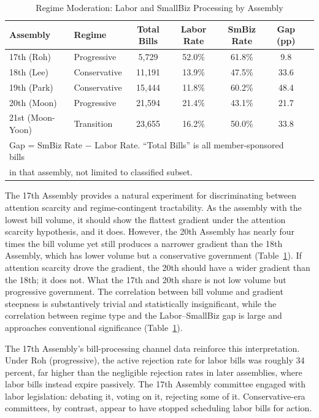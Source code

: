 \documentclass[11pt]{article}
\begin{document}
\begin{table}[htbp]
\centering
\caption{Regime Moderation: Labor and SmallBiz Processing by Assembly}
\label{tab:regime}
\begin{tabular}{llccccc}
\toprule
Assembly & Regime & Total Bills & Labor Rate & SmBiz Rate & Gap (pp) \\
\midrule
17th (Roh) & Progressive & 5,729 & 52.0\% & 61.8\% & 9.8 \\
18th (Lee) & Conservative & 11,191 & 13.9\% & 47.5\% & 33.6 \\
19th (Park) & Conservative & 15,444 & 11.8\% & 60.2\% & 48.4 \\
20th (Moon) & Progressive & 21,594 & 21.4\% & 43.1\% & 21.7 \\
21st (Moon-Yoon) & Transition & 23,655 & 16.2\% & 50.0\% & 33.8 \\
\bottomrule
\multicolumn{6}{l}{\footnotesize Gap = SmBiz Rate $-$ Labor Rate. ``Total Bills'' is all member-sponsored bills} \\
\multicolumn{6}{l}{\footnotesize in that assembly, not limited to classified subset.} \\
\end{tabular}
\end{table}

The 17th Assembly provides a natural experiment for discriminating between attention scarcity and regime-contingent tractability. As the assembly with the lowest bill volume, it should show the flattest gradient under the attention scarcity hypothesis, and it does. However, the 20th Assembly has nearly four times the bill volume yet still produces a narrower gradient than the 18th Assembly, which has lower volume but a conservative government (Table~\ref{tab:regime}). If attention scarcity drove the gradient, the 20th should have a wider gradient than the 18th; it does not. What the 17th and 20th share is not low volume but progressive government. The correlation between bill volume and gradient steepness is substantively trivial and statistically insignificant, while the correlation between regime type and the Labor--SmallBiz gap is large and approaches conventional significance (Table~\ref{tab:regime}).

The 17th Assembly's bill-processing channel data reinforce this interpretation. Under Roh (progressive), the active rejection rate for labor bills was roughly 34 percent, far higher than the negligible rejection rates in later assemblies, where labor bills instead expire passively. The 17th Assembly committee engaged with labor legislation: debating it, voting on it, rejecting some of it. Conservative-era committees, by contrast, appear to have stopped scheduling labor bills for action.
\end{document}
